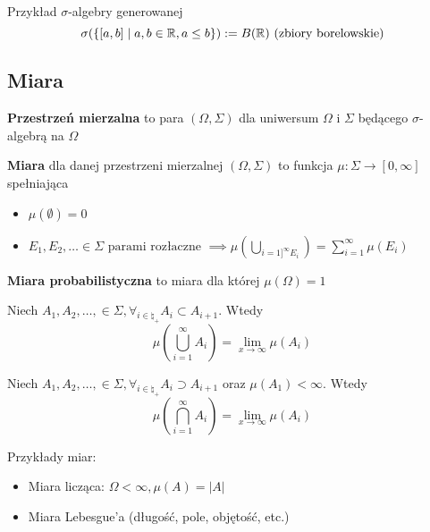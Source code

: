 \begin{example}
	Przykład \(\sigma\)-algebry generowanej
	\[
		\sigma(\set{[a, b] \mid a, b \in \real, a \leq b}) := B(\real) \text{ (zbiory borelowskie)}
	\]
\end{example}


\subsection{Miara}

\begin{definition}
	\textbf{Przestrzeń mierzalna} to para \((\Omega, \Sigma)\) dla uniwersum \(\Omega\) i \(\Sigma\) będącego \(\sigma\)-algebrą na \(\Omega\)
\end{definition}

\begin{definition}
	\textbf{Miara} dla danej przestrzeni mierzalnej \((\Omega, \Sigma)\) to funkcja \(\mu: \Sigma \to [0, \infty]\) spełniająca
	\begin{itemize}
		\item \(\mu(\emptyset) = 0\)
		\item \(E_1, E_2, \dots \in \Sigma \text{ parami rozłaczne } \implies \mu(\bigcup_{i=1]^\infty E_i}) = \sum_{i=1}^{\infty} \mu(E_i)\)
	\end{itemize}
\end{definition}

\begin{definition}
	\textbf{Miara probabilistyczna} to miara dla której \(\mu(\Omega) = 1\)
\end{definition}

\begin{lemma}
	Niech \(A_1, A_2, \dots, \in \Sigma, \forall_{i \in \natural_+} A_i \subset A_{i+1}\). Wtedy
	\[
		\mu(\bigcup_{i=1}^\infty A_i) = \lim_{x \to \infty} \mu(A_i)
	\]
\end{lemma}

\begin{lemma}
	Niech \(A_1, A_2, \dots, \in \Sigma, \forall_{i \in \natural_+} A_i \supset A_{i+1}\) oraz \(\mu(A_1) < \infty\). Wtedy
	\[
		\mu(\bigcap_{i=1}^\infty A_i) = \lim_{x \to \infty} \mu(A_i)
	\]
\end{lemma}

\begin{example}
	Przykłady miar:
	\begin{itemize}
		\item Miara licząca: \(\Omega < \infty, \mu(A) = |A|\)
		\item Miara Lebesgue'a (długość, pole, objętość, etc.)
	\end{itemize}
\end{example}
